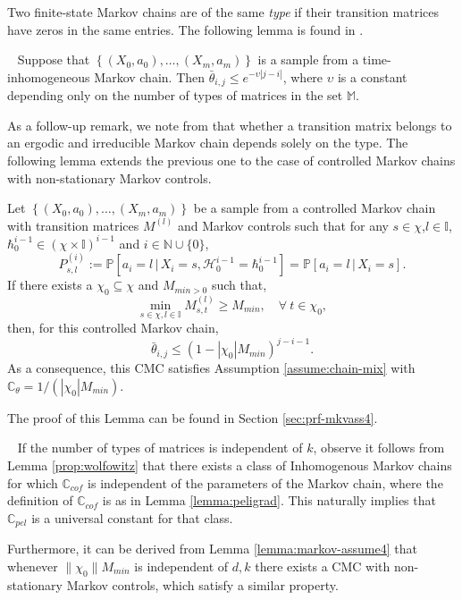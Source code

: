 \documentclass[opre,sglanonrev]{informs4}
\numberwithin{equation}{section}
\newcommand{\pow}[1]{^{(#1)}}
\newcommand{\lp}{\left(}
\newcommand{\rp}{\right)}
\newcommand{\lb}{\left[}
\newcommand{\rb}{\right]}
\newcommand{\History}{\mathcal{H}}
\newcommand{\history}{\hbar}
\newcommand{\Cbb}{\mathbb{C}}
\newcommand{\Ibb}{\mathbb{I}}
\newcommand{\Mbb}{\mathbb{M}}
\newcommand{\Nbb}{\mathbb{N}}
\newcommand{\Pbb}{\mathbb{P}}
\newcommand{\constant}{\Cbb}
\newcommand{\indexeddata}{\left\{(X_0,a_0),\dots,(X_m,a_m)\right\}}
\newcommand{\naturalset}{\Nbb}
\newcommand{\prob}{\Pbb}
\newcommand{\gn}{\, | \,}
\begin{document}
\begin{APPENDICES}
Two finite-state Markov chains are of the same \emph{type} if their transition matrices have zeros in the same entries.
The following lemma is found in \citet[Theorem 1]{wolfowitz1963products}.
\begin{lemma}~\label{prop:wolfowitz}
Suppose that $\indexeddata$ is a sample from a time-inhomogeneous Markov chain. Then $\bar\theta_{i,j}\leq e^{-\upsilon|j-i|}$, where $\upsilon$ is a constant depending only on the number of types of matrices in the set $\Mbb$.
\end{lemma}
As a follow-up remark, we note from \citet{wolfowitz1963products} that whether a transition matrix belongs to an ergodic and irreducible Markov chain depends solely on the type. 
The following lemma extends the previous one to the case of controlled Markov chains with non-stationary Markov controls.
\begin{lemma}\label{lemma:markov-assume4}
Let $\indexeddata$ be a sample from a controlled Markov chain with transition matrices $M\pow{l}$ and Markov controls such that for any $s\in\chi$,$l\in\Ibb$, $\history_{0}^{i-1}\in(\chi\times\Ibb)^{i-1}$ and $i\in\naturalset\cup\{0\}$,
\[
P_{s,l}\pow{i}:=\prob\lb a_i=l\gn X_{i}=s,\History_0^{i-1}=\history_0^{i-1}\rb=\prob\lb a_i=l\gn X_{i}=s\rb.
\]
If there exists a $\chi_0\subseteq\chi$ and $M_{min>0}$ such that,
\[
\min_{s\in\chi,l\in\Ibb} M_{s,t}\pow{l}\geq M_{min}, \quad \forall\ t\in\chi_0,
\]
then, for this controlled Markov chain,
\[
\bar\theta_{i,j} \leq \lp1-|\chi_0|M_{min}\rp^{j-i-1}.
\]
As a consequence, this CMC satisfies Assumption \ref{assume:chain-mix} with $\constant_\theta=1/(|\chi_0|M_{min})$.
\end{lemma}
The proof of this Lemma can be found in Section \ref{sec:prf-mkvass4}.
\begin{remark}~\label{remark:pel-discuss}
If the number of types of matrices is independent of $k$, observe it follows from Lemma \ref{prop:wolfowitz} that there exists a class of Inhomogenous Markov chains for which $\constant_{cof}$ is independent of the parameters of the Markov chain, where the definition of $\constant_{cof}$ is as in Lemma \ref{lemma:peligrad}. This naturally implies that $\constant_{pel}$ is a universal constant for that class.

Furthermore, it can be derived from Lemma \ref{lemma:markov-assume4} that whenever $\|\chi_0\|M_{min}$ is independent of $d,k$ there exists a CMC with non-stationary Markov controls, which satisfy a similar property.
\end{remark}


\end{APPENDICES}
\end{document}
